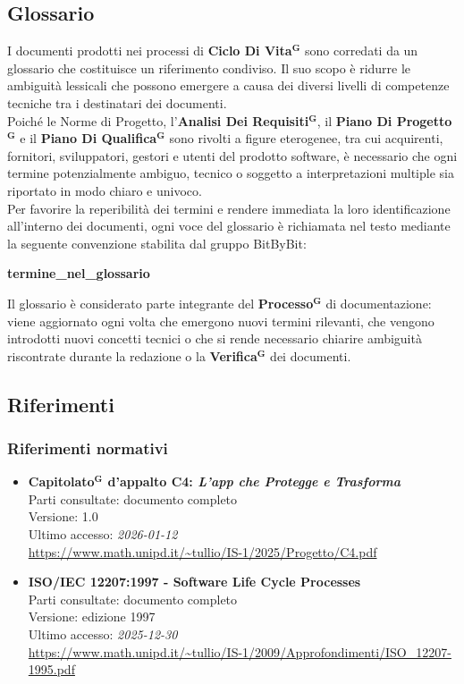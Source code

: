 \documentclass[a4paper,12pt]{article}
\newcommand{\term}[1]{\textbf{#1}$^\mathbf{G}$}
\begin{document}
\subsection{Glossario}
I documenti prodotti nei processi di \term{Ciclo Di Vita} sono corredati da un glossario che costituisce un riferimento condiviso. Il suo scopo è ridurre le ambiguità lessicali che possono emergere a causa dei diversi livelli di competenze tecniche tra i destinatari dei documenti. \\Poiché le Norme di Progetto, l’\term{Analisi Dei Requisiti}, il \term{Piano Di Progetto} e il \term{Piano Di Qualifica} sono rivolti a figure eterogenee, tra cui acquirenti, fornitori, sviluppatori, gestori e utenti del prodotto software, è necessario che ogni termine potenzialmente ambiguo, tecnico o soggetto a interpretazioni multiple sia riportato in modo chiaro e univoco.\\Per favorire la reperibilità dei termini e rendere immediata la loro identificazione all’interno dei documenti, ogni voce del glossario è richiamata nel testo mediante la seguente convenzione stabilita dal gruppo BitByBit: 
\begin{center}
    \textbf{termine\_nel\_glossario}
\end{center}
Il glossario è considerato parte integrante del \term{Processo} di documentazione: viene aggiornato ogni volta che emergono nuovi termini rilevanti, che vengono introdotti nuovi concetti tecnici o che si rende necessario chiarire ambiguità riscontrate durante la redazione o la \term{Verifica} dei documenti.

\subsection{Riferimenti}

\subsubsection{Riferimenti normativi}
\begin{itemize}\raggedright
    \item \textbf{\term{Capitolato} d'appalto C4: \emph{L'app che Protegge e Trasforma}}\\
    Parti consultate: documento completo\\
    Versione: 1.0\\
    Ultimo accesso: \textit{2026-01-12}\\
    \url{https://www.math.unipd.it/~tullio/IS-1/2025/Progetto/C4.pdf}
    \item \textbf{ISO/IEC 12207:1997 - Software Life Cycle Processes}\\
    Parti consultate: documento completo\\
    Versione: edizione 1997\\
    Ultimo accesso: \textit{2025-12-30}\\
    \url{https://www.math.unipd.it/~tullio/IS-1/2009/Approfondimenti/ISO_12207-1995.pdf}
\end{itemize}
\end{document}
